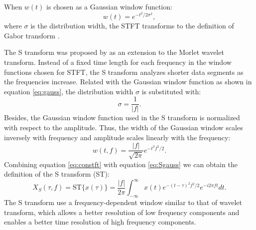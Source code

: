 When $w(t)$ is chosen as a Gaussian window function:
\begin{equation}
\label{eq:gauss}
w(t)=e^{-t^2/2\sigma^2},
\end{equation}
where $\sigma$ is the distribution width, the STFT transforms to the definition of Gabor transform \cite[]{carmona1998}.

The S transform was proposed by \cite{stockwell1996} as an extension to the Morlet wavelet transform. Instead of a fixed time length for each frequency in the window functions chosen for STFT, the S transform analyzes shorter data segments as the frequencies increase. Related with the Gaussian window function as shown in equation \ref{eq:gauss}, the distribution width $\sigma$ is substituted with:
\begin{equation}
\label{eq:inversesigma}
\sigma=\frac{1}{|f|}.
\end{equation}
Besides, the Gaussian window function used in the S transform is normalized with respect to the amplitude. Thus, the width of the Gaussian window scales inversely with frequency and amplitude scales linearly with the frequency:
\begin{equation}
\label{eq:Sgauss}
w(t,f)=\frac{|f|}{\sqrt{2\pi}}e^{-t^2f^2/2}.
\end{equation}
Combining equation \ref{eq:constft} with equation \ref{eq:Sgauss} we can obtain the definition of the S transform (ST):
\begin{equation}
\label{eq:strans}
X_S(\tau,f)=\text{ST}\{x(\tau)\}=\frac{|f|}{2\pi}\int_{-\infty}^{\infty}x(t)e^{-(t-\tau)^2f^2/2}e^{-i2\pi ft}dt.
\end{equation}
The S transform use a frequency-dependent window similar to that of wavelet transform, which allows a better resolution of low frequency components and enables a better time resolution of high frequency components.